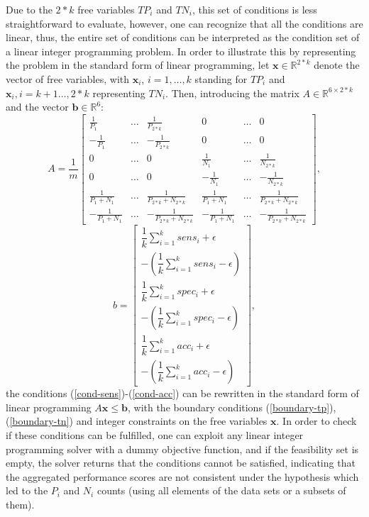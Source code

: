 \documentclass[3p,times]{elsarticle}
\begin{document}
Due to the $2*k$ free variables $TP_i$ and $TN_i$, this set of conditions is less straightforward to evaluate, however, one can recognize that all the conditions are linear, thus, the entire set of conditions can be interpreted as the condition set of a linear integer programming problem. In order to illustrate this by representing the problem in the standard form of linear programming, let $\mathbf{x}\in\mathbb{R}^{2*k}$ denote the vector of free variables, with $\mathbf{x}_i$, $i=1,\dots,k$ standing for $TP_i$ and $\mathbf{x}_i, i=k+1\dots,2*k$ representing $TN_i$. Then, introducing the matrix $A\in\mathbb{R}^{6\times 2*k}$ and the vector $\mathbf{b}\in\mathbb{R}^{6}$:
\begin{equation}
A= \dfrac{1}{m}\left[\begin{array}{cccccc}
\frac{1}{P_1} & \dots & \frac{1}{P_{2*k}} & 0 & \dots & 0 \\
-\frac{1}{P_1} & \dots & -\frac{1}{P_{2*k}} & 0 & \dots & 0 \\
0 & \dots & 0 & \frac{1}{N_1} & \dots & \frac{1}{N_{2*k}}\\
0 & \dots & 0 & -\frac{1}{N_1} & \dots & -\frac{1}{N_{2*k}}\\
\frac{1}{P_1 + N_1} & \dots & \frac{1}{P_{2*k} + N_{2*k}} & \frac{1}{P_1+ N_1} & \dots & \frac{1}{P_{2*k}+N_{2*k}} \\
-\frac{1}{P_1 + N_1} & \dots & -\frac{1}{P_{2*k} + N_{2*k}} & -\frac{1}{P_1 + N_1} & \dots & -\frac{1}{P_{2*k}+ N_{2*k}}
\end{array}\right],
\end{equation}
\begin{equation}
b= \left[\begin{array}{c}\dfrac{1}{k}\sum\limits_{i=1}^k{sens_i} + \epsilon \\
-(\dfrac{1}{k}\sum\limits_{i=1}^k{sens_i} - \epsilon) \\
\dfrac{1}{k}\sum\limits_{i=1}^k{spec_i} + \epsilon \\
-(\dfrac{1}{k}\sum\limits_{i=1}^k{spec_i} - \epsilon) \\
\dfrac{1}{k}\sum\limits_{i=1}^k{acc_i} + \epsilon \\
-(\dfrac{1}{k}\sum\limits_{i=1}^k{acc_i} - \epsilon)
\end{array}\right],
\end{equation}
the conditions (\ref{cond-sens})-(\ref{cond-acc}) can be rewritten in the standard form of linear programming
$A\mathbf{x}  \leq \mathbf{b}$,
with the boundary conditions (\ref{boundary-tp}), (\ref{boundary-tn}) and integer constraints on the free variables $\mathbf{x}$. In order to check if these conditions can be fulfilled, one can exploit any linear integer programming solver with a dummy objective function, and if the feasibility set is empty, the solver returns that the conditions cannot be satisfied, indicating that the aggregated performance scores are not consistent under the hypothesis which led to the $P_i$ and $N_i$ counts (using all elements of the data sets or a subsets of them).
\end{document}

